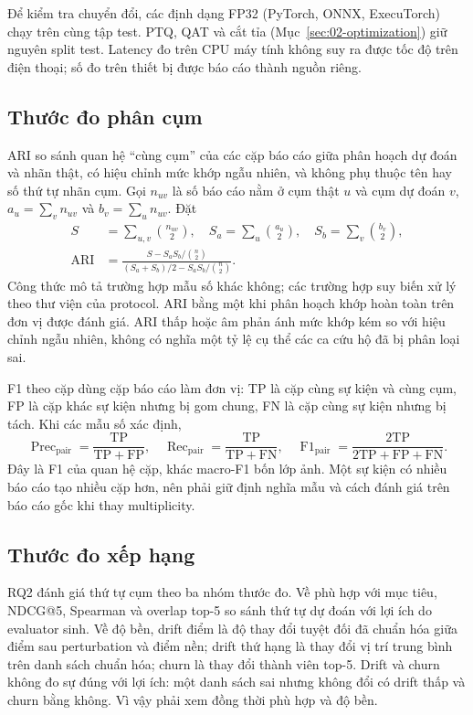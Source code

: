 Để kiểm tra chuyển đổi, các định dạng FP32 (PyTorch, ONNX, ExecuTorch) chạy trên cùng tập test. PTQ, QAT và cắt tỉa (Mục~\ref{sec:02-optimization}) giữ nguyên split test. Latency đo trên CPU máy tính không suy ra được tốc độ trên điện thoại; số đo trên thiết bị được báo cáo thành nguồn riêng.

\subsection{Thước đo phân cụm}
ARI so sánh quan hệ ``cùng cụm'' của các cặp báo cáo giữa phân hoạch dự đoán và nhãn thật, có hiệu chỉnh mức khớp ngẫu nhiên, và không phụ thuộc tên hay số thứ tự nhãn cụm. Gọi $n_{uv}$ là số báo cáo nằm ở cụm thật $u$ và cụm dự đoán $v$, $a_u=\sum_vn_{uv}$ và $b_v=\sum_un_{uv}$. Đặt
\begin{align}
S&=\sum_{u,v}\binom{n_{uv}}{2},\quad
S_a=\sum_u\binom{a_u}{2},\quad S_b=\sum_v\binom{b_v}{2},\\
\operatorname{ARI}&=\frac{S-S_aS_b/\binom{n}{2}}{(S_a+S_b)/2-S_aS_b/\binom{n}{2}}.
\end{align}
Công thức mô tả trường hợp mẫu số khác không; các trường hợp suy biến xử lý theo thư viện của protocol. ARI bằng một khi phân hoạch khớp hoàn toàn trên đơn vị được đánh giá. ARI thấp hoặc âm phản ánh mức khớp kém so với hiệu chỉnh ngẫu nhiên, không có nghĩa một tỷ lệ cụ thể các ca cứu hộ đã bị phân loại sai.

F1 theo cặp dùng cặp báo cáo làm đơn vị: TP là cặp cùng sự kiện và cùng cụm, FP là cặp khác sự kiện nhưng bị gom chung, FN là cặp cùng sự kiện nhưng bị tách. Khi các mẫu số xác định,
\begin{equation}
\operatorname{Prec}_{\mathrm{pair}}=\frac{\mathrm{TP}}{\mathrm{TP}+\mathrm{FP}},\quad
\operatorname{Rec}_{\mathrm{pair}}=\frac{\mathrm{TP}}{\mathrm{TP}+\mathrm{FN}},\quad
\operatorname{F1}_{\mathrm{pair}}=\frac{2\mathrm{TP}}{2\mathrm{TP}+\mathrm{FP}+\mathrm{FN}}.
\end{equation}
Đây là F1 của quan hệ cặp, khác macro-F1 bốn lớp ảnh. Một sự kiện có nhiều báo cáo tạo nhiều cặp hơn, nên phải giữ định nghĩa mẫu và cách đánh giá trên báo cáo gốc khi thay multiplicity.

\subsection{Thước đo xếp hạng}
RQ2 đánh giá thứ tự cụm theo ba nhóm thước đo. Về phù hợp với mục tiêu, NDCG@5, Spearman và overlap top-5 so sánh thứ tự dự đoán với lợi ích do evaluator sinh. Về độ bền, drift điểm là độ thay đổi tuyệt đối đã chuẩn hóa giữa điểm sau perturbation và điểm nền; drift thứ hạng là thay đổi vị trí trung bình trên danh sách chuẩn hóa; churn là thay đổi thành viên top-5. Drift và churn không đo sự đúng với lợi ích: một danh sách sai nhưng không đổi có drift thấp và churn bằng không. Vì vậy phải xem đồng thời phù hợp và độ bền.

